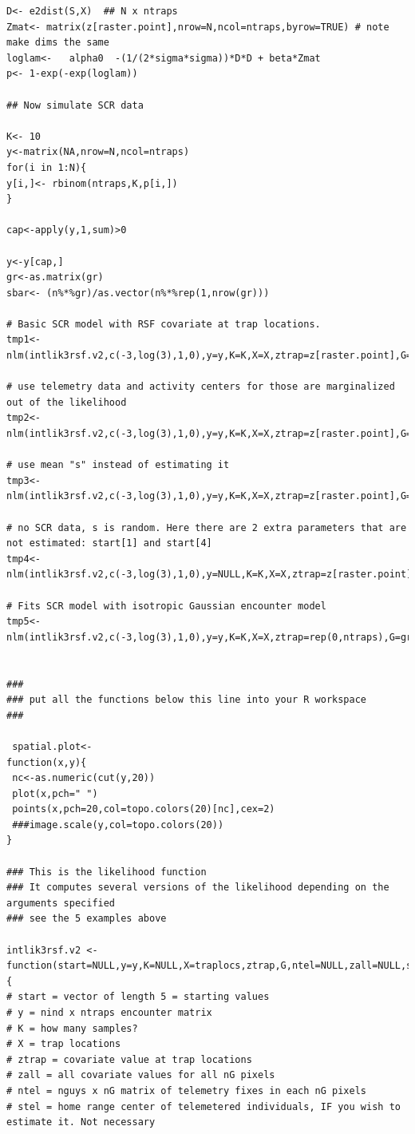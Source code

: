 \documentclass[12pt]{article}
\begin{document}
{\begin{verbatim}
D<- e2dist(S,X)  ## N x ntraps
Zmat<- matrix(z[raster.point],nrow=N,ncol=ntraps,byrow=TRUE) # note make dims the same
loglam<-   alpha0  -(1/(2*sigma*sigma))*D*D + beta*Zmat
p<- 1-exp(-exp(loglam))

## Now simulate SCR data

K<- 10
y<-matrix(NA,nrow=N,ncol=ntraps)
for(i in 1:N){
y[i,]<- rbinom(ntraps,K,p[i,])
}

cap<-apply(y,1,sum)>0

y<-y[cap,]
gr<-as.matrix(gr)
sbar<- (n%*%gr)/as.vector(n%*%rep(1,nrow(gr)))

# Basic SCR model with RSF covariate at trap locations.
tmp1<-nlm(intlik3rsf.v2,c(-3,log(3),1,0),y=y,K=K,X=X,ztrap=z[raster.point],G=gr)

# use telemetry data and activity centers for those are marginalized out of the likelihood
tmp2<-nlm(intlik3rsf.v2,c(-3,log(3),1,0),y=y,K=K,X=X,ztrap=z[raster.point],G=gr,ntel=n,zall=as.vector(z))

# use mean "s" instead of estimating it
tmp3<-nlm(intlik3rsf.v2,c(-3,log(3),1,0),y=y,K=K,X=X,ztrap=z[raster.point],G=gr,ntel=n,zall=as.vector(z),stel=sbar)

# no SCR data, s is random. Here there are 2 extra parameters that are not estimated: start[1] and start[4]
tmp4<-nlm(intlik3rsf.v2,c(-3,log(3),1,0),y=NULL,K=K,X=X,ztrap=z[raster.point],G=gr,ntel=n,zall=as.vector(z))

# Fits SCR model with isotropic Gaussian encounter model
tmp5<- nlm(intlik3rsf.v2,c(-3,log(3),1,0),y=y,K=K,X=X,ztrap=rep(0,ntraps),G=gr)


###
### put all the functions below this line into your R workspace
###

 spatial.plot<-
function(x,y){
 nc<-as.numeric(cut(y,20))
 plot(x,pch=" ")
 points(x,pch=20,col=topo.colors(20)[nc],cex=2)
 ###image.scale(y,col=topo.colors(20))
}

### This is the likelihood function
### It computes several versions of the likelihood depending on the arguments specified
### see the 5 examples above

intlik3rsf.v2 <-function(start=NULL,y=y,K=NULL,X=traplocs,ztrap,G,ntel=NULL,zall=NULL,stel=NULL){
# start = vector of length 5 = starting values
# y = nind x ntraps encounter matrix
# K = how many samples?
# X = trap locations
# ztrap = covariate value at trap locations
# zall = all covariate values for all nG pixels
# ntel = nguys x nG matrix of telemetry fixes in each nG pixels
# stel = home range center of telemetered individuals, IF you wish to estimate it. Not necessary


\end{verbatim}}
\end{document}
